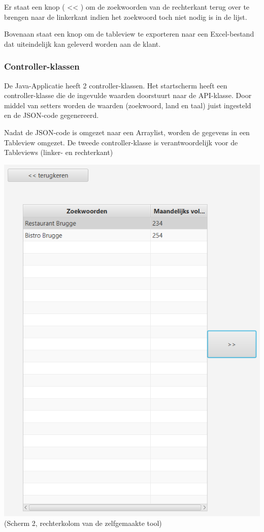 Er staat een knop ( << ) om de zoekwoorden van de rechterkant terug over te brengen naar de linkerkant indien het zoekwoord toch niet nodig is in de lijst. 

Bovenaan staat een knop om de tableview te exporteren naar een Excel-bestand dat uiteindelijk kan geleverd worden aan de klant. 


\subsubsection{Controller-klassen}
\label{ch: Controller-klassen}

De Java-Applicatie heeft 2 controller-klassen. Het startscherm heeft een controller-klasse die de ingevulde waarden doorstuurt naar de API-klasse. Door middel van setters worden de waarden (zoekwoord, land en taal) juist ingesteld en de JSON-code gegenereerd. 

Nadat de JSON-code is omgezet naar een Arraylist, worden de gegevens in een Tableview omgezet. De tweede controller-klasse is verantwoordelijk voor de Tableviews (linker- en rechterkant) 

\includegraphics[width=\linewidth]{Bachelorproef/bachelor/img/scherm2linkerkant.PNG}
(Scherm 2, rechterkolom van de zelfgemaakte tool)